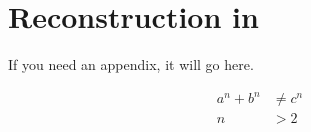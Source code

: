 \chapter{Reconstruction in \lartpcs}
If you need an appendix, it will go here.

\begin{align}
a^n + b^n &\ne c^n \\
n &> 2
\end{align}